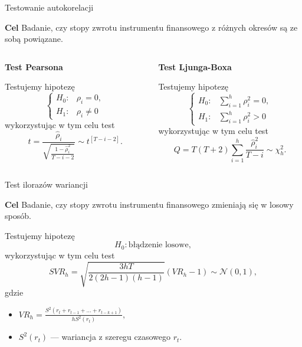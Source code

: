 \documentclass[a4paper, 11pt]{beamer}
\begin{document}
	\begin{frame}{Testowanie autokorelacji}
		\begin{block}{\textbf{Cel}}
			Badanie, czy stopy zwrotu instrumentu finansowego z różnych okresów
			są ze sobą powiązane.
		\end{block}
		\begin{columns}
			\begin{column}{0.5\textwidth}
				\begin{center}
					\textbf{Test Pearsona}
				\end{center}
				Testujemy hipotezę \[
					\begin{cases}
						H_{0}: & \rho_{i}=0,\\
						H_{1}: & \rho_{i}\neq0
					\end{cases}
				\]
				wykorzystując w tym celu test \[
					t=\frac{\hat{\rho}_i}{\sqrt{\frac{1-\hat{\rho}^2_i}{T-i-2}}} \sim t^{\left[T-i-2\right]}.
				\]
			\end{column}
			\begin{column}{0.5\textwidth}
				\begin{center}
					\textbf{Test Ljunga-Boxa}
				\end{center}
				Testujemy hipotezę \[
					\begin{cases}
						H_{0}: & \sum_{i=1}^{h} \rho_{i}^{2}=0,\\
						H_{1}: & \sum_{i=1}^{h} \rho_{i}^{2}>0
					\end{cases}
				\]
				wykorzystując w tym celu test \[
					Q = T \left(T + 2\right) \sum_{i=1}^h \frac{\hat{\rho}^2_i}{T-i} \sim \chi^2_{h}.
				\]
			\end{column}
		\end{columns}
	\end{frame}
	
	\begin{frame}{Test ilorazów wariancji}
		\begin{block}{\textbf{Cel}}
			Badanie, czy stopy zwrotu instrumentu finansowego zmieniają się
			w losowy sposób.
		\end{block}
		Testujemy hipotezę \[
				H_{0}: \mbox{błądzenie losowe},
		\] wykorzystując w tym celu test \[
			SVR_h = \sqrt{\frac{3hT}{2\left(2h-1\right)\left(h-1\right)}} \left(VR_h - 1\right) \sim \mathcal{N}\left(0,1\right),
		\] gdzie
		\begin{itemize}
			\item $VR_h = \frac{S^2\left(r_t+r_{t-1}+\ldots+r_{t-k+1}\right)}{hS^2\left(r_t\right)},$
			\item $S^2\left(r_t\right)$ --- wariancja z szeregu czasowego $r_t.$
		\end{itemize}
	\end{frame}
	
\end{document}
